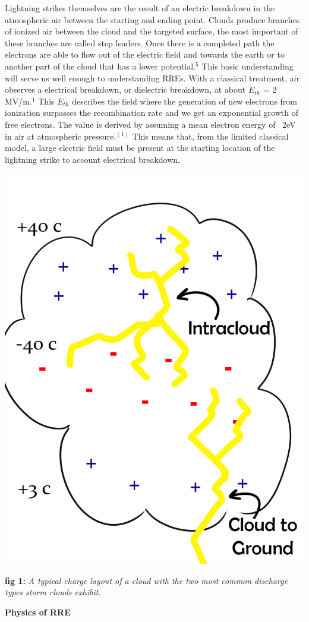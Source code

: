 \documentclass[11pt]{article}
\begin{document}
\begin{multicols*}{2}
    Lightning strikes themselves are the result of an electric breakdown in the atmospheric air between the starting and ending point. Clouds produce branches of ionized air between the cloud and the targeted surface, the most important of these branches are called step leaders. Once there is a completed path the electrons are able to flow out of the electric field and towards the earth or to another part of the cloud that has a lower potential.$^{5}$ This basic understanding will serve us well enough to understanding RREs. With a classical treatment, air observes a electrical breakdown, or dielectric breakdown, at about $E_{th}$ = 2 MV/m.${^1}$ This $E_{th}$ describes the field where the generation of new electrons from ionization surpasses the recombination rate and we get an exponential growth of free electrons. The value is derived by assuming a mean electron energy of ~2eV in air at atmospheric pressure.$^{(1)}$ This means that, from the limited classical model, a large electric field must be present at the starting location of the lightning strike to account electrical breakdown. 
    \begin{center}
        \includegraphics[width=.65\linewidth]{clouds.png}
    \end{center}
    \textbf{fig 1:} \textit{A typical charge layout of a cloud with the two most common discharge types storm clouds exhibit.}
    \newline
    

    \noindent
{\bf \LARGE Physics of RRE}
    

\end{multicols*}
\end{document}
